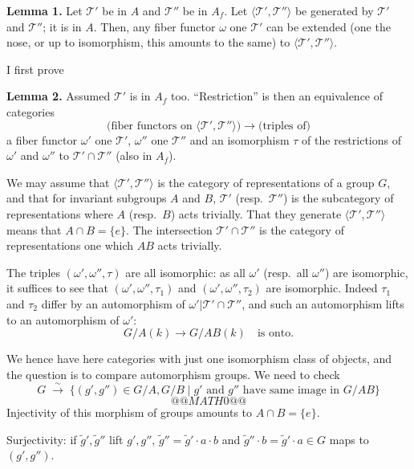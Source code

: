 \documentclass[11pt,a4paper]{article}
\theoremstyle{plain}
\theoremstyle{definition}
\begin{document}
\medskip
\noindent\textbf{Lemma 1.} Let $\mathcal{T}'$ be in $A$ and $\mathcal{T}''$ be in
$A_f$. Let $\langle \mathcal{T}', \mathcal{T}'' \rangle$ be generated by
$\mathcal{T}'$ and $\mathcal{T}''$; it is in $A$. Then, any fiber functor
$\omega$ one $\mathcal{T}'$ can be extended (one the nose, or up to isomorphism,
this amounts to the same) to $\langle \mathcal{T}', \mathcal{T}'' \rangle$.

\medskip
\noindent I first prove

\medskip
\noindent\textbf{Lemma 2.} Assumed $\mathcal{T}'$ is in $A_f$ too.
``Restriction'' is then an equivalence of categories
\[
\text{(fiber functors on } \langle \mathcal{T}', \mathcal{T}'' \rangle \text{)}
\longrightarrow
\text{(triples of)}
\]
a fiber functor $\omega'$ one $\mathcal{T}'$, $\omega''$ one $\mathcal{T}''$ and an
isomorphism $\tau$ of the restrictions of $\omega'$ and $\omega''$ to
$\mathcal{T}' \cap \mathcal{T}''$ (also in $A_f$).

\medskip

We may assume that $\langle \mathcal{T}', \mathcal{T}'' \rangle$ is the category
of representations of a group $G$, and that for invariant subgroups $A$ and $B$,
$\mathcal{T}'$ (resp.~$\mathcal{T}''$) is the subcategory of representations
where $A$ (resp.~$B$) acts trivially. That they generate
$\langle \mathcal{T}', \mathcal{T}'' \rangle$ means that
$A \cap B = \{e\}$. The intersection $\mathcal{T}' \cap \mathcal{T}''$ is the
category of representations one which $AB$ acts trivially.

The triples $(\omega', \omega'', \tau)$ are all isomorphic: as all $\omega'$
(resp.~all $\omega''$) are isomorphic, it suffices to see that
$(\omega', \omega'', \tau_1)$ and $(\omega', \omega'', \tau_2)$ are isomorphic.
Indeed $\tau_1$ and $\tau_2$ differ by an automorphism of
$\omega'|\mathcal{T}' \cap \mathcal{T}''$, and such an automorphism lifts to
an automorphism of $\omega'$:
\[
G/A(k) \longrightarrow G/AB(k) \quad \text{is onto.}
\]

We hence have here categories with just one isomorphism class of objects, and
the question is to compare automorphism groups. We need to check
\[
G \;\xrightarrow{\sim}\; \{(g', g'') \in G/A, G/B \mid g' \text{ and } g''
\text{ have same image in } G/AB\}
\]
\[
@@MATH0@@
\]
Injectivity of this morphism of groups amounts to $A \cap B = \{e\}$.

Surjectivity: if $\tilde{g}', \tilde{g}''$ lift $g', g''$,
$\tilde{g}'' = \tilde{g}' \cdot a \cdot b$ and
$\tilde{g}'' \cdot b = \tilde{g}' \cdot a \in G$ maps to $(g', g'')$.
\end{document}
